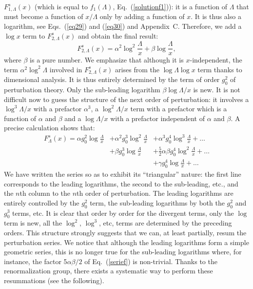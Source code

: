 \documentclass[floatfix,twocolumn,preprintnumbers,amsmath,amssymb,prb]{revtex4}
\begin{document}
$F_{1,\Lambda}^s(x)$ (which is equal to 
$f_1(\Lambda)$, Eq.~(\ref{solutionf1})): it is a function of
$\Lambda$ that must become a function of $x/\Lambda$ only by
adding a function of $x$. It is thus also a logarithm, see
Eqs.~(\ref{eq29}) and (\ref{eq30}) and Appendix~C. Therefore,
we add a $\log x$ term to
$F_{2,\Lambda}^s(x)$ and obtain the final result:
\begin{equation}
F_{2,\Lambda}^s(x)= \alpha^2 \log^2\frac{\Lambda}{x} + \beta
\log\frac{\Lambda}{x},
\label{solutionf2exemple}
\end{equation}
where $\beta$ is a pure number. We emphasize that although it is
$x$-independent, the term $\alpha^2 \log^2\Lambda$ involved in
$F_{2,\Lambda}^s(x)$ arises from the $\log\Lambda \log x$ term
thanks to dimensional analysis. It is thus entirely determined by
the term of order $g_0^2$ of perturbation theory. Only the
sub-leading logarithm $\beta \log\Lambda/x$ is new. It is not
difficult now to guess the structure of the next order of
perturbation: it involves a $\log^3{\Lambda}/{x}$ with a prefactor
$\alpha^3$, a $\log^2{\Lambda}/{x}$ term with a prefactor which
is a function of $\alpha$ and $\beta$ and a $\log{\Lambda}/{x}$
with a prefactor independent of $\alpha$ and $\beta$. A precise
calculation shows that:
\begin{equation}
\begin{array}{lll}
F_{\Lambda}^s(x)={\displaystyle\alpha g_0^2\log\frac{\Lambda}{x}} 
       &{\displaystyle+ \alpha^2 g_0^3 \log^2\frac{\Lambda}{x}} &{\displaystyle+\alpha^3g_0^4 \log^3\frac{\Lambda}{x}+\dots} \\
       &{\displaystyle+  \beta g_0^3 \log\frac{\Lambda}{x}}     &{\displaystyle+\frac{5}{2}\alpha\beta g_0^4\log^2\frac{\Lambda}{x}+\dots}\\
       &                                                        &{\displaystyle+\gamma g_0^4\log\frac{\Lambda}{x}+\dots}
\end{array}
\label{serief}
\end{equation}
We have written the series so as to exhibit its ``triangular''
nature: the first line corresponds to the leading logarithms, the
second to the sub-leading, etc., and the $n$th column to the 
$n$th order of perturbation. The leading logarithms are
entirely controlled by the $g_0^2$ term, the sub-leading
logarithms by both the
$g_0^2$ and $g_0^3$ terms, etc. It is clear that order by order
for the divergent terms, only the $\log$ term is new, all the
$\log^2$, $\log^3$, etc, terms are determined by the preceding
orders. This structure strongly suggests that we can,
at least partially, resum the perturbation series. We notice
that although the leading logarithms form a simple geometric
series, this is no longer true for the sub-leading logarithms
where, for instance, the factor 5$\alpha\beta/2$ of
Eq.~(\ref{serief}) is non-trivial. Thanks to the renormalization
group, there exists a systematic way to perform these
resummations\cite{shirkov01} (see the following).
\end{document}
